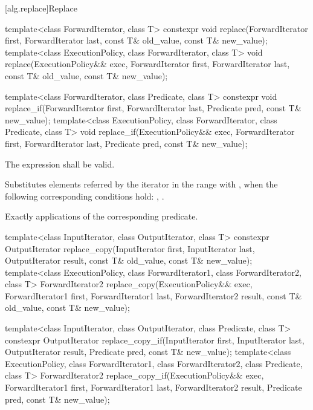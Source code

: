 [alg.replace]{Replace}

%
%
\begin{itemdecl}
template<class ForwardIterator, class T>
  constexpr void replace(ForwardIterator first, ForwardIterator last,
                         const T& old_value, const T& new_value);
template<class ExecutionPolicy, class ForwardIterator, class T>
  void replace(ExecutionPolicy&& exec,
               ForwardIterator first, ForwardIterator last,
               const T& old_value, const T& new_value);

template<class ForwardIterator, class Predicate, class T>
  constexpr void replace_if(ForwardIterator first, ForwardIterator last,
                            Predicate pred, const T& new_value);
template<class ExecutionPolicy, class ForwardIterator, class Predicate, class T>
  void replace_if(ExecutionPolicy&& exec,
                  ForwardIterator first, ForwardIterator last,
                  Predicate pred, const T& new_value);
\end{itemdecl}

\begin{itemdescr}
\pnum
\requires
The expression
shall be valid.

\pnum
\effects
Substitutes elements referred by the iterator
in the range 
with ,
when the following corresponding conditions hold:
, .

\pnum
\complexity
Exactly
applications of the corresponding predicate.
\end{itemdescr}

%
%
\begin{itemdecl}
template<class InputIterator, class OutputIterator, class T>
  constexpr OutputIterator
    replace_copy(InputIterator first, InputIterator last,
                 OutputIterator result,
                 const T& old_value, const T& new_value);
template<class ExecutionPolicy, class ForwardIterator1, class ForwardIterator2, class T>
  ForwardIterator2
    replace_copy(ExecutionPolicy&& exec,
                 ForwardIterator1 first, ForwardIterator1 last,
                 ForwardIterator2 result,
                 const T& old_value, const T& new_value);

template<class InputIterator, class OutputIterator, class Predicate, class T>
  constexpr OutputIterator
    replace_copy_if(InputIterator first, InputIterator last,
                    OutputIterator result,
                    Predicate pred, const T& new_value);
template<class ExecutionPolicy, class ForwardIterator1, class ForwardIterator2,
         class Predicate, class T>
  ForwardIterator2
    replace_copy_if(ExecutionPolicy&& exec,
                    ForwardIterator1 first, ForwardIterator1 last,
                    ForwardIterator2 result,
                    Predicate pred, const T& new_value);
\end{itemdecl}

